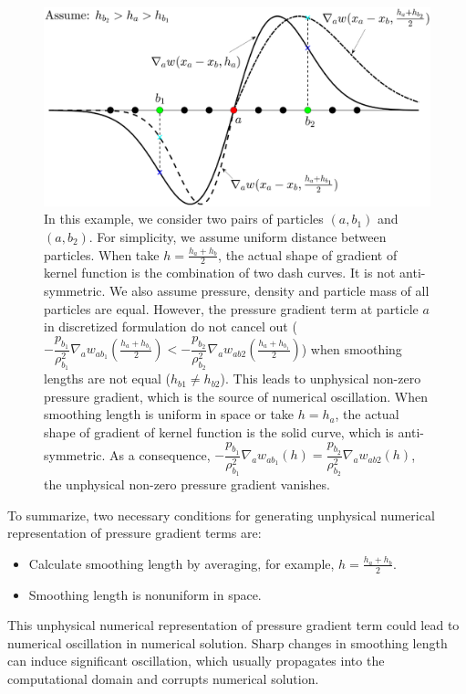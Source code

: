 \documentclass[preprint,12pt,authoryear]{elsarticle}
\begin{document}
\begin{figure}[H]
\centering
\includegraphics[width=0.90 \textwidth ]{App-Figure/dw-ha}
\caption{In this example, we consider two pairs of particles $(a, b_1)$ and $(a, b_2)$. For simplicity, we assume uniform distance between particles. When take $h=\frac{h_a + h_b}{2}$, the actual shape of gradient of kernel function is the combination of two dash curves. It is not anti-symmetric.
We also assume pressure, density and particle mass of all particles are equal. However, the pressure gradient term at particle $a$ in discretized formulation do not cancel out ( $-\dfrac{p_{b_1}}{\rho_{b_1}^2} \nabla_a w_{a b_1}\left(\frac{h_a+h_{b_1}}{2}\right) < -\dfrac{p_{b_2}}{\rho_{b_2}^2} \nabla_a w_{a b2}\left(\frac{h_a+h_{b_1}}{2}\right)$) when smoothing lengths are not equal ($h_{b1} \neq h_{b2}$). This leads to unphysical non-zero pressure gradient, which is the source of numerical oscillation. When smoothing length is uniform in space or take $h = h_a$, the actual shape of gradient of kernel function is the solid curve, which is anti-symmetric. As a consequence, $-\dfrac{p_{b_1}}{\rho_{b_1}^2} \nabla_a w_{a b_1}\left(h\right) = \dfrac{p_{b_2}}{\rho_{b_2}^2} \nabla_a w_{a b2}\left(h\right)$, the unphysical non-zero pressure gradient vanishes.}    
\label{fig:dw-ha}
\end{figure}

To summarize, two necessary conditions for generating unphysical numerical representation of pressure gradient terms are:
\begin{itemize}
\item Calculate smoothing length by averaging, for example, $h = \frac{h_a + h_b}{2}$.
\item Smoothing length is nonuniform in space.
\end{itemize} 
This unphysical numerical representation of pressure gradient term could lead to numerical oscillation in numerical solution. Sharp changes in smoothing length can induce significant oscillation, which usually propagates into the computational domain and corrupts numerical solution.
\end{document}
